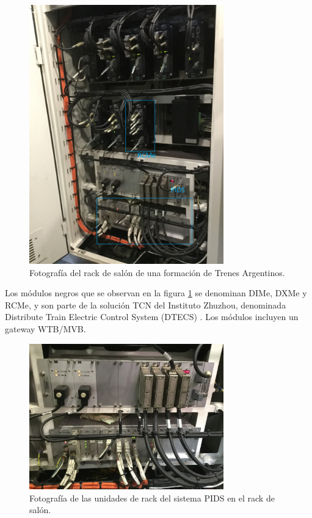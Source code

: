\begin{figure}[ht]
	\centering
	\includegraphics[width=0.75\textwidth , angle=0]{./Figures/imgRackTCN.JPG}
	\caption{Fotografía del rack de salón de una formación de Trenes Argentinos.}
	\label{fig:imgRackTCN}
\end{figure}

Los módulos negros que se observan en la figura \ref{fig:imgRackTCN} se denominan DIMe, DXMe y RCMe, y son parte de la solución TCN del Instituto Zhuzhou, denominada Distribute Train Electric Control System (DTECS)  \cite{feng2016survey}. Los módulos incluyen un gateway WTB/MVB. \\

\begin{figure}[h!]
	\centering
	\includegraphics[width=0.75\textwidth]{./Figures/rackPIDS1.JPG}
	\caption{Fotografía de las unidades de rack del sistema PIDS en el rack de salón.}
	\label{fig:rackPIDS1}
\end{figure}


